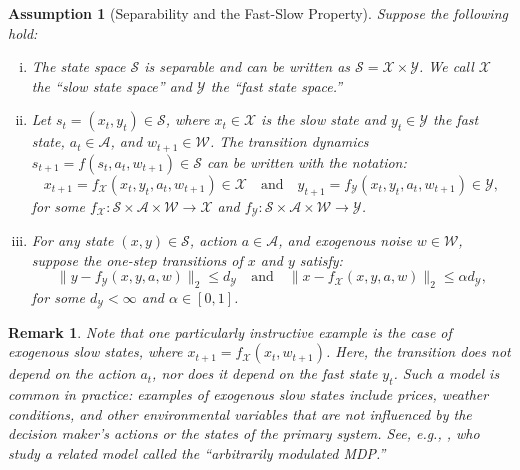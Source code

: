 \documentclass[11pt, notitlepage]{article}
\newcommand{\1}{\mathbbm{1}}
\newtheorem{assumption}{Assumption}
\newtheorem{remark}{Remark}
\begin{document}
\begin{assumption}[Separability and the Fast-Slow Property]
Suppose the following hold:
\begin{enumerate}[(i)]
    \item The state space $\mathcal{S}$ is separable and can be written as $\mathcal S = \mathcal{X}\times\mathcal{Y}$. We call $\mathcal X$ the ``slow state space'' and $\mathcal Y$ the ``fast state space.''
    
    \item Let $s_{t} = (x_t, y_t) \in \mathcal S$, where $x_t \in \mathcal X$ is the slow state and $y_t \in \mathcal Y$ the fast state, $a_t \in \mathcal A$, and $w_{t+1} \in \mathcal W$. The transition dynamics $s_{t+1} = f(s_t, a_t, w_{t+1}) \in \mathcal S$ can be written with the notation:
    \[
    x_{t+1} = f_\mathcal{X}(x_t,y_t,a_t, w_{t+1}) \in \mathcal X \quad \text{and} \quad y_{t+1} = f_\mathcal{Y}(x_t, y_t, a_t, w_{t+1}) \in \mathcal Y,
    \]
    for some $f_\mathcal{X}: \mathcal{S}\times\mathcal{A} \times \mathcal{W} \rightarrow \mathcal{X}$ and $f_\mathcal{Y}: \mathcal{S}\times \mathcal{A}\times \mathcal{W} \rightarrow \mathcal{Y}$.
    
    \item For any state $(x,y) \in \mathcal S$, action $a \in \mathcal A$, and exogenous noise $w \in \mathcal W$, 
    suppose the one-step transitions of $x$ and $y$ satisfy:
    \begin{equation*}
        \bigl\|y-f_\mathcal{Y}(x,y,a,w)\bigr\|_2 \leq d_\mathcal{Y} \quad \text{and} \quad \bigl \|x-f_\mathcal{X}(x,y,a,w) \bigr\|_2 \leq \alpha d_\mathcal{Y},
    \end{equation*}
    for some $d_\mathcal{Y} < \infty$ and $\alpha \in [0, 1]$.

\end{enumerate}
\label{assumption.fast_slow_transition}
\end{assumption}

\begin{remark}
Note that one particularly instructive example is the case of exogenous slow states, where $x_{t+1} = f_\mathcal{X}(x_t, w_{t+1})$. Here, the transition does not depend on the action $a_t$, nor does it depend on the fast state $y_t$. Such a model is common in practice: examples of exogenous slow states include prices, weather conditions, and other environmental variables that are not influenced by the decision maker's actions or the states of the primary system. See, e.g., \cite{yu2009arbitrarily}, who study a related model called the ``arbitrarily modulated MDP.''
\end{remark}
\end{document}

